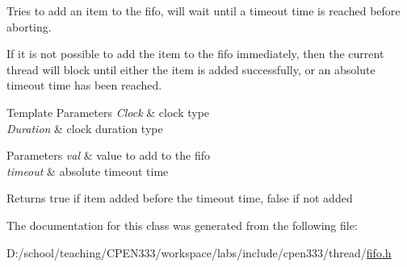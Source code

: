 Tries to add an item to the fifo, will wait until a timeout time is reached before aborting. 

If it is not possible to add the item to the fifo immediately, then the current thread will block until either the item is added successfully, or an absolute timeout time has been reached.


\begin{DoxyTemplParams}{Template Parameters}
{\em Clock} & clock type \\
\hline
{\em Duration} & clock duration type \\
\hline
\end{DoxyTemplParams}

\begin{DoxyParams}{Parameters}
{\em val} & value to add to the fifo \\
\hline
{\em timeout} & absolute timeout time \\
\hline
\end{DoxyParams}
\begin{DoxyReturn}{Returns}
{\ttfamily true} if item added before the timeout time, {\ttfamily false} if not added 
\end{DoxyReturn}


The documentation for this class was generated from the following file\+:\begin{DoxyCompactItemize}
\item 
D\+:/school/teaching/\+C\+P\+E\+N333/workspace/labs/include/cpen333/thread/\hyperlink{thread_2fifo_8h}{fifo.\+h}\end{DoxyCompactItemize}
